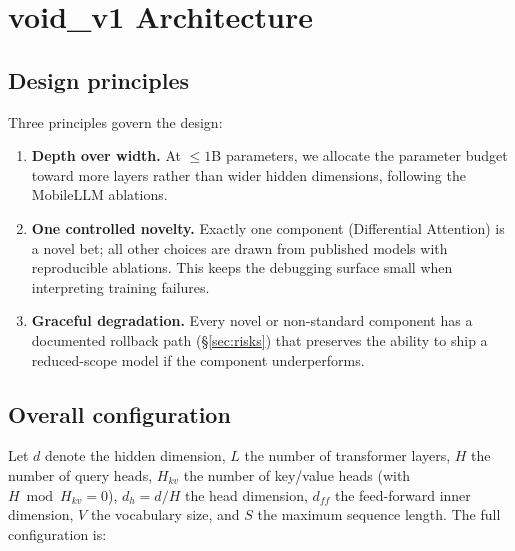 \documentclass[11pt,a4paper]{article}
\theoremstyle{definition}
\theoremstyle{remark}
\begin{document}
\section{void\_v1 Architecture}
\label{sec:arch}

\subsection{Design principles}

Three principles govern the design:

\begin{enumerate}[leftmargin=1.5em,itemsep=0.2em]
    \item \textbf{Depth over width.} At $\leq 1$B parameters, we allocate the
          parameter budget toward more layers rather than wider hidden
          dimensions, following the MobileLLM ablations.
    \item \textbf{One controlled novelty.} Exactly one component
          (Differential Attention) is a novel bet; all other choices are
          drawn from published models with reproducible ablations. This
          keeps the debugging surface small when interpreting training
          failures.
    \item \textbf{Graceful degradation.} Every novel or non-standard
          component has a documented rollback path
          (\S\ref{sec:risks}) that preserves the ability to ship a
          reduced-scope model if the component underperforms.
\end{enumerate}

\subsection{Overall configuration}
\label{sec:config}

Let $d$ denote the hidden dimension, $L$ the number of transformer layers,
$H$ the number of query heads, $H_{kv}$ the number of key/value heads (with
$H \bmod H_{kv} = 0$), $d_h = d / H$ the head dimension, $d_{ff}$ the
feed-forward inner dimension, $V$ the vocabulary size, and $S$ the maximum
sequence length. The full configuration is:
\end{document}

